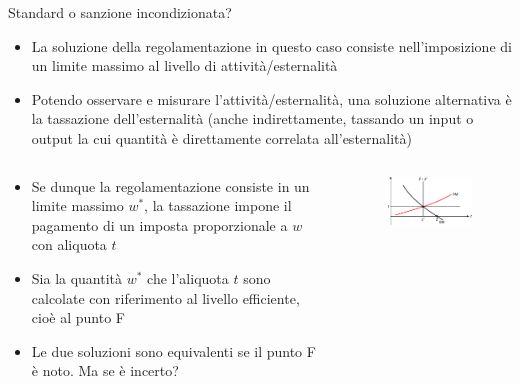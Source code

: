 \documentclass[aspectratio=64,11pt]{beamer}
\begin{document}
\begin{frame}{Standard o sanzione incondizionata?}
\begin{itemize}
\item La soluzione della regolamentazione in questo caso consiste nell'imposizione
di un \alert{limite massimo} al livello di attività/esternalità
\item Potendo osservare e misurare l'attività/esternalità, una soluzione
alternativa è la \alert{tassazione} dell'esternalità (anche indirettamente,
tassando un input o output la cui quantità è direttamente correlata
all'esternalità)
\end{itemize}

\begin{columns}
\begin{column}{.5\columnwidth}
\begin{itemize}
\item Se dunque la regolamentazione consiste in un limite massimo $w^*$, la
tassazione impone il pagamento di un imposta proporzionale a $w$ con
aliquota $t$
\item Sia la quantità $w^*$ che l'aliquota $t$ sono calcolate con riferimento
al livello efficiente, cioè al punto F
\item Le due soluzioni sono equivalenti se il punto F è noto. Ma se è incerto?
\end{itemize}
\end{column}
\begin{column}{.5\columnwidth}
\begin{figure}
\centering
\includegraphics[width=\textwidth]{./figure/esternalita-5-color.pdf}
\end{figure}
\end{column}
\end{columns}
\end{frame}
\end{document}
